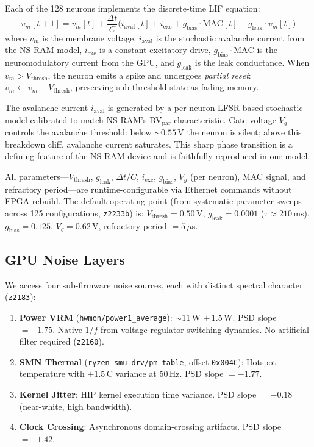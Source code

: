 \documentclass[11pt]{article}
\newcommand{\expt}[1]{\texttt{z#1}}
\begin{document}
Each of the 128 neurons implements the discrete-time LIF
equation:
%
\begin{equation}
  v_m[t+1] = v_m[t] + \frac{\Delta t}{C}\bigl(
    i_\text{aval}[t] + i_\text{exc} + g_\text{bias} \cdot
    \text{MAC}[t] - g_\text{leak} \cdot v_m[t]
  \bigr)
  \label{eq:lif}
\end{equation}
%
where $v_m$ is the membrane voltage, $i_\text{aval}$ is the
stochastic avalanche current from the NS-RAM model,
$i_\text{exc}$ is a constant excitatory drive,
$g_\text{bias} \cdot \text{MAC}$ is the neuromodulatory
current from the GPU, and $g_\text{leak}$ is the leak
conductance.  When $v_m > V_\text{thresh}$, the neuron emits
a spike and undergoes \emph{partial reset}:
$v_m \leftarrow v_m - V_\text{thresh}$, preserving sub-threshold
state as fading memory.

The avalanche current $i_\text{aval}$ is generated by a
per-neuron LFSR-based stochastic model calibrated to match
NS-RAM's BV$_\text{par}$ characteristic.  Gate voltage $V_g$
controls the avalanche threshold: below $\sim 0.55$\,V the
neuron is silent; above this breakdown cliff, avalanche current
saturates.  This sharp phase transition is a defining feature
of the NS-RAM device and is faithfully reproduced in our model.

All parameters---$V_\text{thresh}$, $g_\text{leak}$,
$\Delta t/C$, $i_\text{exc}$, $g_\text{bias}$,
$V_g$ (per neuron), MAC signal, and refractory period---are
runtime-configurable via Ethernet commands without FPGA
rebuild.  The default operating point (from systematic
parameter sweeps across 125 configurations, \expt{2233b}) is:
$V_\text{thresh} = 0.50$\,V, $g_\text{leak} = 0.0001$
($\tau \approx 210$\,ms), $g_\text{bias} = 0.125$,
$V_g = 0.62$\,V, refractory period $= 5\,\mu$s.

\subsection{GPU Noise Layers}
\label{sec:gpu-noise}

We access four sub-firmware noise sources, each with distinct
spectral character (\expt{2183}):

\begin{enumerate}[leftmargin=1.5em, itemsep=2pt]
  \item \textbf{Power VRM} (\texttt{hwmon/power1\_average}):
    $\sim 11$\,W $\pm\, 1.5$\,W.  PSD slope $= -1.75$.
    Native $1/f$ from voltage regulator switching dynamics.
    No artificial filter required (\expt{2160}).
  \item \textbf{SMN Thermal}
    (\texttt{ryzen\_smu\_drv/pm\_table}, offset \texttt{0x004C}):
    Hotspot temperature with $\pm 1.5$\,\textdegree C variance at
    50\,Hz.  PSD slope $= -1.77$.
  \item \textbf{Kernel Jitter}: HIP kernel execution time
    variance.  PSD slope $= -0.18$ (near-white, high bandwidth).
  \item \textbf{Clock Crossing}: Asynchronous domain-crossing
    artifacts.  PSD slope $= -1.42$.
\end{enumerate}
\end{document}
